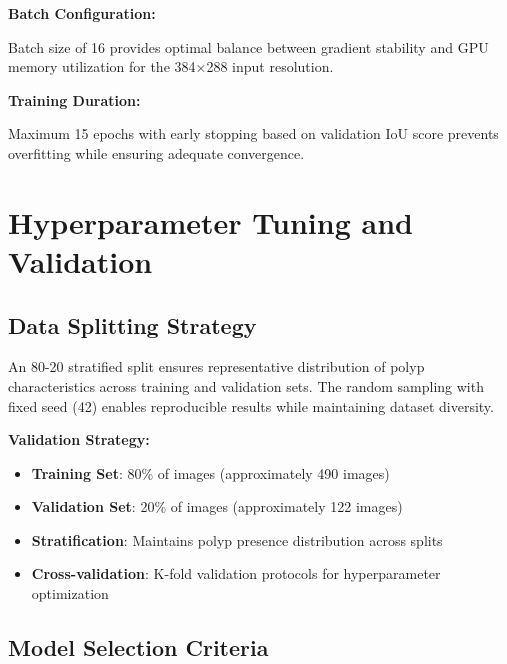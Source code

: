 \documentclass[a4paper,12pt]{report}
\begin{document}
\noindent\textbf{\normalsize Batch Configuration:}
\vspace{0.5em}

Batch size of 16 provides optimal balance between gradient stability and GPU memory utilization for the 384×288 input resolution.

\vspace{1em}

\noindent\textbf{\normalsize Training Duration:}
\vspace{0.5em}

Maximum 15 epochs with early stopping based on validation IoU score prevents overfitting while ensuring adequate convergence.

\section{Hyperparameter Tuning and Validation}

\subsection{Data Splitting Strategy}

An 80-20 stratified split ensures representative distribution of polyp characteristics across training and validation sets. The random sampling with fixed seed (42) enables reproducible results while maintaining dataset diversity.

\vspace{1em}

\noindent\textbf{\normalsize Validation Strategy:}
\vspace{0.5em}

\begin{itemize}
    \item \textbf{Training Set}: 80\% of images (approximately 490 images)
    \item \textbf{Validation Set}: 20\% of images (approximately 122 images)
    \item \textbf{Stratification}: Maintains polyp presence distribution across splits
    \item \textbf{Cross-validation}: K-fold validation protocols for hyperparameter optimization
\end{itemize}

\vspace{1em}

\subsection{Model Selection Criteria}
\end{document}
